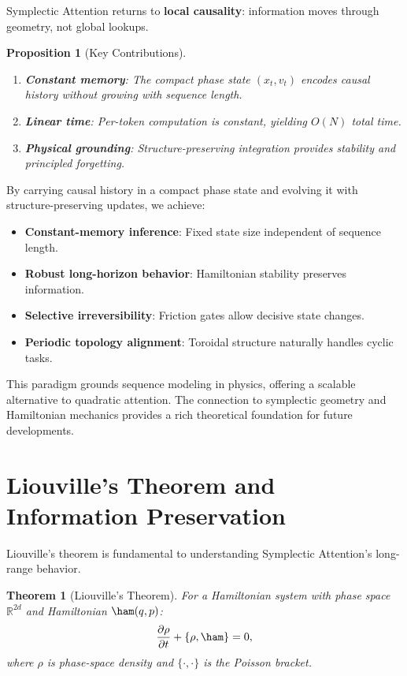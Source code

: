 \documentclass[12pt,letterpaper,twoside]{article}
\newtheorem{theorem}{Theorem}[section]
\newtheorem{prop}{Proposition}[section]
\begin{document}
Symplectic Attention returns to \textbf{local causality}: information moves through geometry, not global lookups.

\begin{prop}[Key Contributions]
\begin{enumerate}
\item \textbf{Constant memory}: The compact phase state $(x_t, v_t)$ encodes causal history without growing with sequence length.
\item \textbf{Linear time}: Per-token computation is constant, yielding $O(N)$ total time.
\item \textbf{Physical grounding}: Structure-preserving integration provides stability and principled forgetting.
\end{enumerate}
\end{prop}

By carrying causal history in a compact phase state and evolving it with structure-preserving updates, we achieve:

\begin{itemize}
\item \textbf{Constant-memory inference}: Fixed state size independent of sequence length.
\item \textbf{Robust long-horizon behavior}: Hamiltonian stability preserves information.
\item \textbf{Selective irreversibility}: Friction gates allow decisive state changes.
\item \textbf{Periodic topology alignment}: Toroidal structure naturally handles cyclic tasks.
\end{itemize}

This paradigm grounds sequence modeling in physics, offering a scalable alternative to quadratic attention. The connection to symplectic geometry and Hamiltonian mechanics provides a rich theoretical foundation for future developments.

\clearpage

\appendix

\section{Liouville's Theorem and Information Preservation}

Liouville's theorem is fundamental to understanding Symplectic Attention's long-range behavior.

\begin{theorem}[Liouville's Theorem]
For a Hamiltonian system with phase space $\mathbb{R}^{2d}$ and Hamiltonian $\ham(q, p)$:
\[
\frac{\partial \rho}{\partial t} + \{\rho, \ham\} = 0,
\]
where $\rho$ is phase-space density and $\{\cdot, \cdot\}$ is the Poisson bracket.
\end{theorem}
\end{document}
